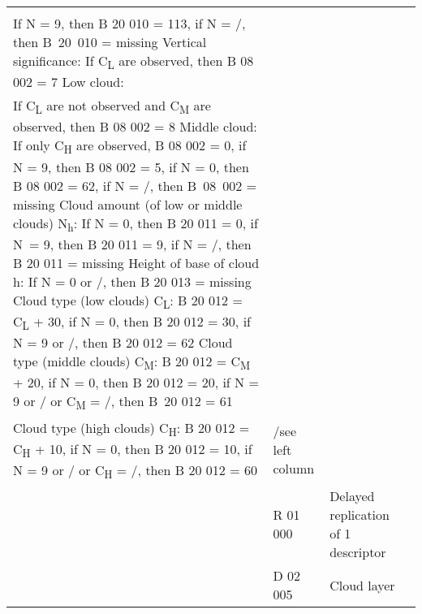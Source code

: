 \begin{longtable}[]{@{}llll@{}}
\begin{minipage}[t]{0.22\columnwidth}
\begin{quote}
Cloud cover (total) N:\\
If N = 9, then B 20 010 = 113, if N = /, then B~20~010 = missing \textbf{\textbar{}} Vertical significance: If C\textsubscript{L} are observed, then B 08 002 = 7 \textbf{\textbar{}} Low cloud:\\
If C\textsubscript{L} are not observed and C\textsubscript{M} are observed, then B 08 002 = 8 \textbf{\textbar{}} Middle cloud: If only C\textsubscript{H} are observed, B 08 002 = 0, if N = 9, then B 08 002 = 5, if N = 0, then B 08 002 = 62, if N = /, then B~08~002 = missing \textbf{\textbar{}} Cloud amount (of low or middle clouds) N\textsubscript{h}: If N = 0, then B 20 011 = 0, if N~= 9, then B 20 011 = 9, if N = /, then B 20 011 = missing \textbf{\textbar{}} Height of base of cloud h: If N = 0 or /, then B 20 013 = missing \textbf{\textbar{}} Cloud type (low clouds) C\textsubscript{L}: B 20 012 = C\textsubscript{L} + 30, if N = 0, then B 20 012 = 30, if N = 9 or /, then B 20 012 = 62 \textbf{\textbar{}} Cloud type (middle clouds) C\textsubscript{M}: B 20 012 = C\textsubscript{M} + 20, if N = 0, then B 20 012 = 20, if N = 9 or / or C\textsubscript{M} = /, then B~20 012 = 61 \textbf{\textbar{}}\\
Cloud type (high clouds) C\textsubscript{H}: B 20 012 = C\textsubscript{H} + 10, if N = 0, then B 20 012 = 10, if N = 9 or / or C\textsubscript{H} = /, then B 20 012 = 60
\end{quote}\strut
\end{minipage} & \begin{minipage}[t]{0.22\columnwidth}\raggedright
/see left column\strut
\end{minipage}\tabularnewline
& R 01 000 & Delayed replication of 1 descriptor &\tabularnewline
\begin{minipage}[t]{0.22\columnwidth}\raggedright
\strut
\end{minipage} & \begin{minipage}[t]{0.22\columnwidth}\raggedright
D 02 005\strut
\end{minipage} & \begin{minipage}[t]{0.22\columnwidth}\raggedright
Cloud layer


\end{minipage}
\end{longtable}
